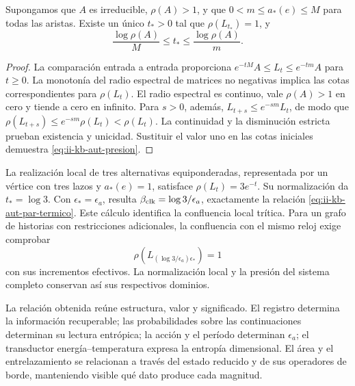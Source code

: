 \begin{proposition}
Supongamos que \(A\) es irreducible, \(\rho(A)>1\), y que
\(0<m\leq a_*(e)\leq M\) para todas las aristas. Existe un único
\(t_*>0\) tal que \(\rho(L_{t_*})=1\), y
\begin{equation}
 \frac{\log\rho(A)}{M}\leq t_*\leq
 \frac{\log\rho(A)}{m}.
 \label{eq:ii-kb-aut-presion}
\end{equation}
\end{proposition}
\begin{proof}
La comparación entrada a entrada proporciona
\(e^{-tM}A\leq L_t\leq e^{-tm}A\) para \(t\geq0\).
La monotonía del radio espectral de matrices no negativas implica
las cotas correspondientes para \(\rho(L_t)\). El radio espectral
es continuo, vale \(\rho(A)>1\) en cero y tiende a cero en infinito.
Para \(s>0\), además,
\(L_{t+s}\leq e^{-sm}L_t\), de modo que
\(\rho(L_{t+s})\leq e^{-sm}\rho(L_t)<\rho(L_t)\).
La continuidad y la disminución estricta prueban existencia y
unicidad. Sustituir el valor uno en las cotas iniciales demuestra
\eqref{eq:ii-kb-aut-presion}.
\end{proof}

La realización local de tres alternativas equiponderadas, representada
por un vértice con tres lazos y \(a_*(e)=1\), satisface
\(\rho(L_t)=3e^{-t}\). Su normalización da \(t_*=\log3\).
Con \(\epsilon_*=\epsilon_a\), resulta
\(\beta_{\rm clk}=\log3/\epsilon_a\), exactamente la relación
\eqref{eq:ii-kb-aut-par-termico}. Este cálculo identifica la
confluencia local trítica. Para un grafo de historias con restricciones
adicionales, la confluencia con el mismo reloj exige comprobar
\[
 \rho\!\left(L_{(\log3/\epsilon_a)\epsilon_*}\right)=1
\]
con sus incrementos efectivos. La normalización local y la presión
del sistema completo conservan así sus respectivos dominios.

La relación obtenida reúne estructura, valor y significado. El registro
determina la información recuperable; las probabilidades sobre las
continuaciones determinan su lectura entrópica; la acción y el período
determinan \(\epsilon_a\); el transductor energía--temperatura
expresa la entropía dimensional. El área y el entrelazamiento se
relacionan a través del estado reducido y de sus operadores de borde,
manteniendo visible qué dato produce cada magnitud.

